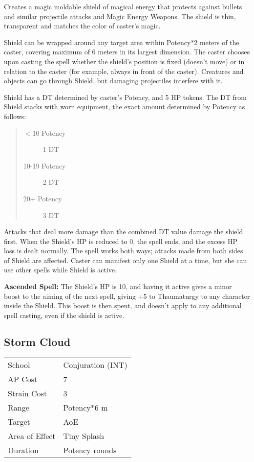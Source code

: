 \documentclass[11pt,a4paper,twocolumn]{book}
\begin{document}
\medskip

Creates a magic moldable shield of magical energy that protects against bullets and similar projectile attacks and Magic Energy Weapons. The shield is thin, transparent and matches the color of caster's magic.

Shield can be wrapped around any target area within Potency*2 meters of the caster, covering maximum of 6 meters in its largest dimension. The caster chooses upon casting the spell whether the shield's position is fixed (doesn't move) or in relation to the caster (for example, always in front of the caster). Creatures and objects can go through Shield, but damaging projectiles interfere with it.

Shield has a DT determined by caster's Potency, and 5 HP tokens. The DT from Shield stacks with worn equipment, the exact amount determined by Potency as follows:
\begin{quote}
	\begin{description}
		\item[$<$10 Potency] 	1 DT
		\item[10-19 Potency]    2 DT
		\item[20+ Potency] 		3 DT
	\end{description}
\end{quote}

Attacks that deal more damage than the combined DT value damage the shield first. When the Shield's HP is reduced to 0, the spell ends, and the excess HP loss is dealt normally. The spell works both ways; attacks made from both sides of Shield are affected. Caster can manifest only one Shield at a time, but she can use other spells while Shield is active.

\bigskip

\textbf{Ascended Spell:} The Shield's HP is 10, and having it active gives a minor boost to the aiming of the next spell, giving +5 to Thaumaturgy to any character inside the Shield. This boost is then spent, and doesn't apply to any additional spell casting, even if the shield is active.


\subsection*{Storm Cloud}
{
	\begin{tabu} to 75mm{| X[l,4] | X[l,7] |}
		\hline
		School 			& Conjuration (INT)		\\
		AP Cost	      	& 7 					\\
		Strain Cost     & 3 					\\
		Range     		& Potency*6 m			\\
		Target      	& AoE					\\
		Area of Effect  & Tiny Splash 	 		\\
		Duration     	& Potency rounds		\\ \hline
	\end{tabu}
	
}
\end{document}
